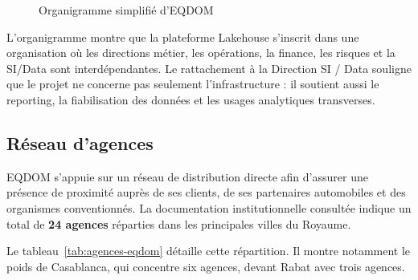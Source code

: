 \begin{figure}[H]
{
}
\caption{Organigramme simplifié d'EQDOM}
\label{fig:organigramme-eqdom}
\end{figure}

L'organigramme montre que la plateforme Lakehouse s'inscrit dans une organisation où les directions métier, les opérations, la finance, les risques et la SI/Data sont interdépendantes. Le rattachement à la Direction SI / Data souligne que le projet ne concerne pas seulement l'infrastructure : il soutient aussi le reporting, la fiabilisation des données et les usages analytiques transverses.

\subsection{Réseau d'agences}

EQDOM s'appuie sur un réseau de distribution directe afin d'assurer une présence de proximité auprès de ses clients, de ses partenaires automobiles et des organismes conventionnés. La documentation institutionnelle consultée indique un total de \textbf{24 agences} réparties dans les principales villes du Royaume.

Le tableau~\ref{tab:agences-eqdom} détaille cette répartition. Il montre notamment le poids de Casablanca, qui concentre six agences, devant Rabat avec trois agences.

